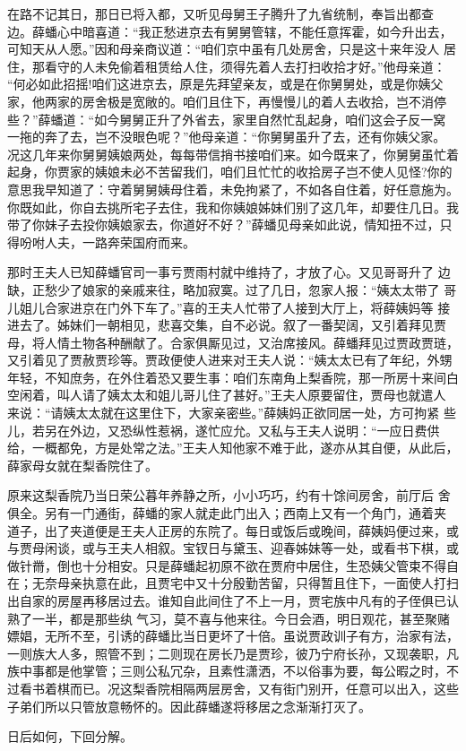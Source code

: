 在路不记其日，那日已将入都，又听见母舅王子腾升了九省统制，奉旨出都查
边。薛蟠心中暗喜道：“我正愁进京去有舅舅管辖，不能任意挥霍，如今升出去，
可知天从人愿。”因和母亲商议道：“咱们京中虽有几处房舍，只是这十来年没人
居住，那看守的人未免偷着租赁给人住，须得先着人去打扫收拾才好。”他母亲道：
“何必如此招摇!咱们这进京去，原是先拜望亲友，或是在你舅舅处，或是你姨父
家，他两家的房舍极是宽敞的。咱们且住下，再慢慢儿的着人去收拾，岂不消停
些？”薛蟠道：“如今舅舅正升了外省去，家里自然忙乱起身，咱们这会子反一窝
一拖的奔了去，岂不没眼色呢？”他母亲道：“你舅舅虽升了去，还有你姨父家。
况这几年来你舅舅姨娘两处，每每带信捎书接咱们来。如今既来了，你舅舅虽忙着
起身，你贾家的姨娘未必不苦留我们，咱们且忙忙的收拾房子岂不使人见怪?你的
意思我早知道了：守着舅舅姨母住着，未免拘紧了，不如各自住着，好任意施为。
你既如此，你自去挑所宅子去住，我和你姨娘姊妹们别了这几年，却要住几日。我
带了你妹子去投你姨娘家去，你道好不好？”薛蟠见母亲如此说，情知扭不过，只
得吩咐人夫，一路奔荣国府而来。

那时王夫人已知薛蟠官司一事亏贾雨村就中维持了，才放了心。又见哥哥升了
边缺，正愁少了娘家的亲戚来往，略加寂寞。过了几日，忽家人报：“姨太太带了
哥儿姐儿合家进京在门外下车了。”喜的王夫人忙带了人接到大厅上，将薛姨妈等
接进去了。姊妹们一朝相见，悲喜交集，自不必说。叙了一番契阔，又引着拜见贾
母，将人情土物各种酬献了。合家俱厮见过，又治席接风。薛蟠拜见过贾政贾琏，
又引着见了贾赦贾珍等。贾政便使人进来对王夫人说：“姨太太已有了年纪，外甥
年轻，不知庶务，在外住着恐又要生事：咱们东南角上梨香院，那一所房十来间白
空闲着，叫人请了姨太太和姐儿哥儿住了甚好。”王夫人原要留住，贾母也就遣人
来说：“请姨太太就在这里住下，大家亲密些。”薛姨妈正欲同居一处，方可拘紧
些儿，若另在外边，又恐纵性惹祸，遂忙应允。又私与王夫人说明：“一应日费供
给，一概都免，方是处常之法。”王夫人知他家不难于此，遂亦从其自便，从此后，
薛家母女就在梨香院住了。

原来这梨香院乃当日荣公暮年养静之所，小小巧巧，约有十馀间房舍，前厅后
舍俱全。另有一门通街，薛蟠的家人就走此门出入；西南上又有一个角门，通着夹
道子，出了夹道便是王夫人正房的东院了。每日或饭后或晚间，薛姨妈便过来，或
与贾母闲谈，或与王夫人相叙。宝钗日与黛玉、迎春姊妹等一处，或看书下棋，或
做针黹，倒也十分相安。只是薛蟠起初原不欲在贾府中居住，生恐姨父管束不得自
在；无奈母亲执意在此，且贾宅中又十分殷勤苦留，只得暂且住下，一面使人打扫
出自家的房屋再移居过去。谁知自此间住了不上一月，贾宅族中凡有的子侄俱已认
熟了一半，都是那些纨气习，莫不喜与他来往。今日会酒，明日观花，甚至聚赌
嫖娼，无所不至，引诱的薛蟠比当日更坏了十倍。虽说贾政训子有方，治家有法，
一则族大人多，照管不到；二则现在房长乃是贾珍，彼乃宁府长孙，又现袭职，凡
族中事都是他掌管；三则公私冗杂，且素性潇洒，不以俗事为要，每公暇之时，不
过看书着棋而已。况这梨香院相隔两层房舍，又有街门别开，任意可以出入，这些
子弟们所以只管放意畅怀的。因此薛蟠遂将移居之念渐渐打灭了。

日后如何，下回分解。